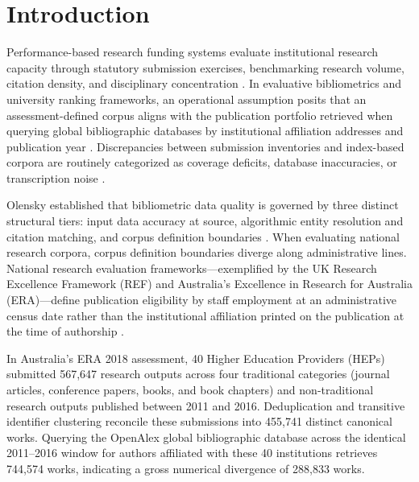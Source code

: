 \section{Introduction}\label{sec:intro}

Performance-based research funding systems evaluate institutional research capacity through statutory submission exercises, benchmarking research volume, citation density, and disciplinary concentration \cite{hicksPerformancebasedUniversityResearch2012}. In evaluative bibliometrics and university ranking frameworks, an operational assumption posits that an assessment-defined corpus aligns with the publication portfolio retrieved when querying global bibliographic databases by institutional affiliation addresses and publication year \cite{vanraanUseBibliometricAnalysis2003,vanraanFatalAttractionConceptual2005}. Discrepancies between submission inventories and index-based corpora are routinely categorized as coverage deficits, database inaccuracies, or transcription noise \cite{olenskyDataAccuracyBibliometric2015,olenskyEvaluationCitationMatching2016}.

Olensky established that bibliometric data quality is governed by three distinct structural tiers: input data accuracy at source, algorithmic entity resolution and citation matching, and corpus definition boundaries \cite{olenskyDataAccuracyBibliometric2015}. When evaluating national research corpora, corpus definition boundaries diverge along administrative lines. National research evaluation frameworks---exemplified by the UK Research Excellence Framework (REF) and Australia's Excellence in Research for Australia (ERA)---define publication eligibility by staff employment at an administrative census date rather than the institutional affiliation printed on the publication at the time of authorship \cite{mowBlackBoxResearch2010}.

In Australia's ERA 2018 assessment, 40 Higher Education Providers (HEPs) submitted 567,647 research outputs across four traditional categories (journal articles, conference papers, books, and book chapters) and non-traditional research outputs published between 2011 and 2016. Deduplication and transitive identifier clustering reconcile these submissions into 455,741 distinct canonical works. Querying the OpenAlex global bibliographic database \cite{priemOpenAlexFullyopenIndex2022} across the identical 2011--2016 window for authors affiliated with these 40 institutions retrieves 744,574 works, indicating a gross numerical divergence of 288,833 works.

